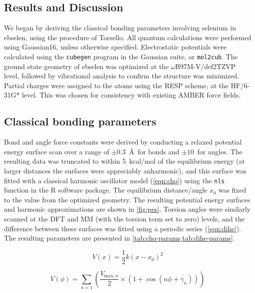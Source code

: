 \begin{refsection}
\section{Results and Discussion}
We began by deriving the classical bonding parameters involving selenium in ebselen, using the procedure of Torsello.\autocite{Torsello2016}
All quantum calculations were performed using Gaussian16, unless otherwise specified.\autocite{gaussian16}
Electrostatic potentials were calculated using the \texttt{cubegen} program in the Gaussian suite, or \texttt{mol2cub}.\autocite{mol2cub}
The ground state geometry of ebselen was optimized at the $\omega$B97M-V/def2TZVP level, followed by vibrational analysis to confirm the structure was minimized.\autocite{Chai2008,Weigend2005,Weigend2006}
Partial charges were assigned to the atoms using the RESP scheme, at the HF/6-31G* level.\autocite{Cornell1993}
This was chosen for consistency with existing AMBER force fields.

\subsection{Classical bonding parameters}
Bond and angle force constants were derived by conducting a relaxed potential energy surface scan over a range of $\pm0.3$~\AA~for bonds and $\pm10$\degree~for angles.
The resulting data was truncated to within 5~kcal/mol of the equilibrium energy (at larger distances the surfaces were appreciably anharmonic), and this surface was fitted with a classical harmonic oscillator model (\cref{eqn:cho}) using the \texttt{nls} function in the R software package.\autocite{R}
The equilibrium distance/angle $x_0$ was fixed to the value from the optimized geometry.
The resulting potential energy surfaces and harmonic approximations are shown in \cref{fig:pes}.
Torsion angles were similarly scanned at the DFT and MM (with the torsion term set to zero) levels, and the difference between these surfaces was fitted using a periodic series (\cref{eqn:dihe}).
The resulting parameters are presented in \cref{tab:cho-params,tab:dihe-params}.

\begin{equation}
    V(x) = \frac{1}{2} k (x - x_0) ^2
    \label{eqn:cho}
\end{equation}

\begin{equation}
    V(\phi) = \sum_{n=1} \left( \frac{V_{\mathrm{max},n}}{2} \times (1 + \cos(n \phi + \gamma_n)) \right)
    \label{eqn:dihe}
\end{equation}


\end{refsection}
